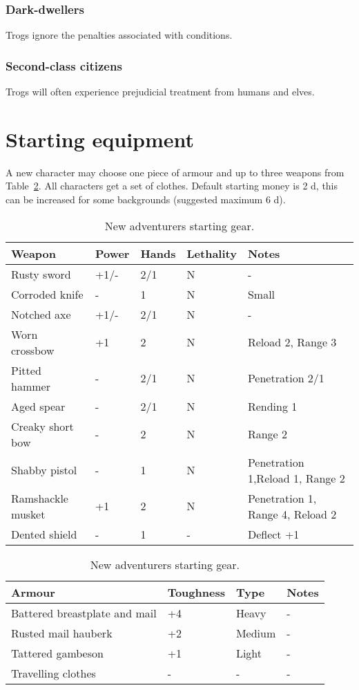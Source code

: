 \documentclass[a4paper,11pt,oneside]{book}
\newcommand{\textlf}[1]{\textbf{\titlecap{#1}}}
\begin{document}
\subsubsection*{Dark-dwellers}
Trogs ignore the penalties associated with \textlf{low light} conditions.

\subsubsection*{Second-class citizens}
Trogs will often experience prejudicial treatment from humans and elves.



\section{Starting equipment}
A new character may choose one piece of armour and up to three weapons from Table~\ref{tab:start-gear}. All characters get a set of clothes. Default starting money is 2 d, this can be increased for some backgrounds (suggested maximum 6 d).
\begin{table}[ht!]
	\centering
	\caption{New adventurers starting gear.}
	\label{tab:start-gear}
	\begin{tabular}{|l|l|l|l|l|}
		\hline
		Weapon & Power & Hands &  Lethality & Notes\\
		\hline
		Rusty sword & +1/- & 2/1 & N & -\\
		Corroded knife & - & 1 & N & Small\\
		Notched axe & +1/- & 2/1 & N & -\\
		Worn crossbow & +1 & 2 & N & Reload 2, Range 3\\
		Pitted hammer & - & 2/1 & N & Penetration 2/1 \\
		Aged spear & - & 2/1 & N & Rending 1\\
		Creaky short bow & - & 2 & N & Range 2\\
		Shabby pistol & - & 1 & N & Penetration 1,Reload 1, Range 2 \\
		Ramshackle musket & +1 & 2 & N & Penetration 1, Range 4, Reload 2 \\
		Dented shield & - & 1 & - & Deflect +1 \\
		\hline
	\end{tabular}
	\begin{tabular}{|l|l|l|l|}	
		\hline
		Armour & Toughness & Type & Notes\\
		\hline
		Battered breastplate and mail & +4 & Heavy & - \\
		Rusted mail hauberk & +2 & Medium & - \\
		Tattered gambeson & +1 & Light & - \\
		Travelling clothes & - & - & - \\
		\hline
	\end{tabular}
\end{table}
\end{document}
